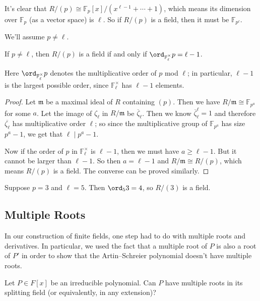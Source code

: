 It's clear that $R/(p) \cong \mathbb{F}_p[x]/(x^{\ell - 1} + \cdots + 1)$, which means its dimension over $\mathbb{F}_p$ (as a vector space) is $\ell$. So if $R/(p)$ is a field, then it must be $\mathbb{F}_{p^\ell}$. 

We'll assume $p \neq \ell$. 

\begin{proposition}
    If $p \neq \ell$, then $R/(p)$ is a field if and only if $\ord_{\mathbb{F}_\ell^\times} p = \ell - 1$.
\end{proposition}

Here $\ord_{\mathbb{F}_\ell^\times} p$ denotes the multiplicative order of $p$ mod $\ell$; in particular, $\ell - 1$ is the largest possible order, since $\mathbb{F}_\ell^\times$ has $\ell - 1$ elements. 

\begin{proof}
    Let $\mathfrak{m}$ be a maximal ideal of $R$ containing $(p)$. Then we have $R/\mathfrak{m} \cong \mathbb{F}_{p^a}$ for some $a$. Let the image of $\zeta_\ell$ in $R/\mathfrak{m}$ be $\overline{\zeta}_\ell$. Then we know $\overline{\zeta}_\ell^\ell = 1$ and therefore $\overline{\zeta_\ell}$ has multiplicative order $\ell$; so since the multiplicative group of  $\mathbb{F}_{p^a}$ has size $p^a - 1$, we get that $\ell \mid p^a - 1$. 

    Now if the order of $p$ in $\mathbb{F}_\ell^\times$ is $\ell - 1$, then we must have $a \geq \ell - 1$. But it cannot be larger than $\ell - 1$. So then $a = \ell - 1$ and $R/\mathfrak{m} \cong R/(p)$, which means $R/(p)$ is a field. The converse can be proved similarly. 
\end{proof}

\begin{example}
    Suppose $p = 3$ and $\ell = 5$. Then $\ord_5 3 = 4$, so $R/(3)$ is a field. 
\end{example}

\subsection{Multiple Roots}

In our construction of finite fields, one step had to do with multiple roots and derivatives. In particular, we used the fact that a multiple root of $P$ is also a root of $P'$ in order to show that the Artin--Schreier polynomial doesn't have multiple roots. 

\begin{qq}
    Let $P \in F[x]$ be an irreducible polynomial. Can $P$ have multiple roots in its splitting field (or equivalently, in any extension)?
\end{qq}


